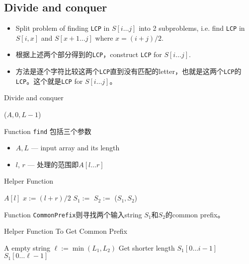 \subsection{Divide and conquer}
\begin{itemize}
\item Split problem of finding \texttt{LCP} in $S[i\ldots j]$ into 2 subproblems, i.e. find \texttt{LCP} in $S[i,x]$ and $S[x+1\ldots j]$ where $x = (i+j)/2$.
\item 根据上述两个部分得到的\texttt{LCP}，construct \texttt{LCP} for $S[i\ldots j]$.
\item 方法是逐个字符比较这两个\texttt{LCP}直到没有匹配的letter，也就是这两个\texttt{LCP}的\texttt{LCP}。这个就是\texttt{LCP} for $S[i\ldots j]$。
\end{itemize}
\begin{algorithm}[H]
\caption{Divide and conquer}
\begin{algorithmic}[1]
\State \Return {}($A, 0, L-1$)
\EndProcedure
\end{algorithmic}
\end{algorithm}
Function \texttt{find} 包括三个参数
\begin{itemize}
\item $A, L$ --- input array and its length
\item $l$, $r$ --- 处理的范围即$A[l\ldots r]$
\end{itemize}
\begin{algorithm}[H]
\caption{Helper Function}
\begin{algorithmic}[1]
\State \Return $A[l]$
\EndIf
\State $x:=(l+r)/2$
\State $S_1 :=$ 
\State $S_2 :=$ 
\State \Return {}($S_{1}, S_{2}$)
\EndProcedure
\Statex
\end{algorithmic}
\end{algorithm}

Function \texttt{CommonPrefix}则寻找两个输入string $S_1$和$ S_2 $的common prefix。
\begin{algorithm}[H]
\caption{Helper Function To Get Common Prefix}
\begin{algorithmic}[1]
\State \Return A empty string
\EndIf
\State $\ell:= \min(L_1, L_2)$ \Comment Get shorter length
\State \Return $S_1[0\ldots i-1]$ 
\EndIf
\EndFor
\State \Return $S_1[0\ldots \ell-1]$ 
\EndProcedure
\Statex
\end{algorithmic}
\end{algorithm}